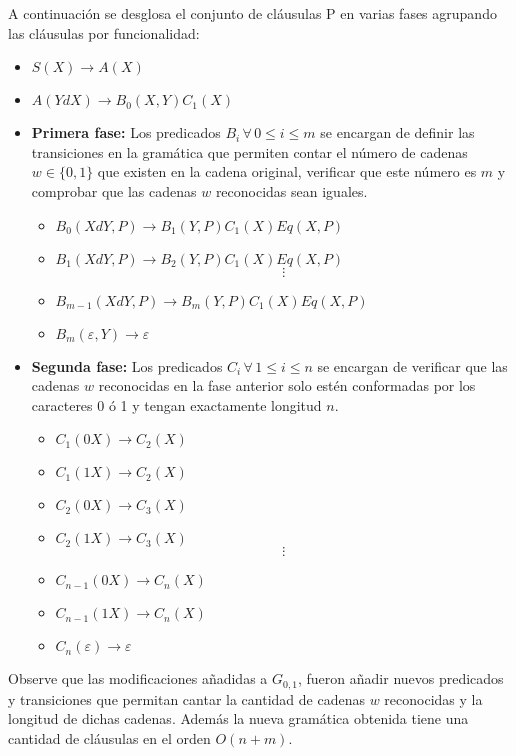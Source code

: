 \documentclass[12pt]{article}
\begin{document}
A continuación se desglosa el conjunto de cláusulas P en varias fases agrupando las cláusulas por funcionalidad:
\begin{itemize}
    \item  $S(X)\to A(X)$
    \item $A(YdX)\to B_0(X,Y)C_1(X)$
    \item \textbf{Primera fase:} Los predicados $B_i\,\forall\,0\leq i\leq m$ se encargan de definir las transiciones en la gramática
          que permiten contar el número de cadenas $w\in \{0,1\}$ que existen en la cadena original, verificar que
          este número es $m$ y comprobar que las cadenas $w$ reconocidas sean iguales.
          \begin{itemize}
              \item $B_0(XdY,P)\to B_1(Y,P) C_1(X) Eq(X,P)$
              \item $B_1(XdY,P)\to B_2(Y,P) C_1(X) Eq(X,P)$
                    $$\vdots$$
              \item $B_{m-1}(XdY,P)\to B_m(Y,P) C_1(X) Eq(X,P)$
              \item $B_m(\varepsilon,Y)\to \varepsilon$
          \end{itemize}
    \item \textbf{Segunda fase:} Los predicados $C_i\,\forall\,1\leq i\leq n$ se encargan de verificar que las
          cadenas $w$ reconocidas en la fase anterior solo estén conformadas por los caracteres 0 ó 1 y tengan exactamente
          longitud $n$.
          \begin{itemize}
              \item $C_1(0X)\to C_2(X)$
              \item $C_1(1X)\to C_2(X)$
              \item $C_2(0X)\to C_3(X)$
              \item $C_2(1X)\to C_3(X)$
                    $$\vdots$$
              \item $C_{n-1}(0X)\to C_n(X)$
              \item $C_{n-1}(1X)\to C_n(X)$
              \item $C_n(\varepsilon)\to \varepsilon$
          \end{itemize}
\end{itemize}

Observe que las modificaciones añadidas a $G_{0,1}$, fueron añadir nuevos predicados y transiciones que permitan
cantar la cantidad de cadenas $w$ reconocidas y la longitud de dichas cadenas. Además la nueva gramática obtenida
tiene una cantidad de cláusulas en el orden $O(n+m)$.
\end{document}
